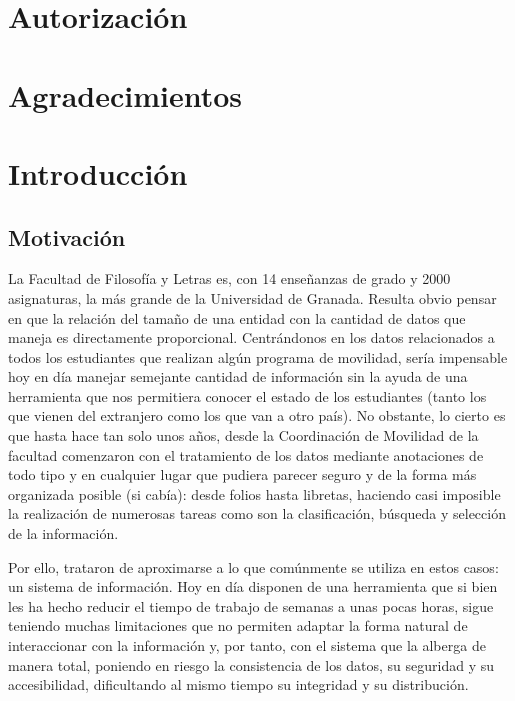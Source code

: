 \documentclass[12pt]{article}
\begin{document}


\section*{Autorización}

\section*{Agradecimientos}

\newpage

\tableofcontents

\newpage

\listoffigures
\listoftables


\section{Introducción}
\subsection{Motivación}

La Facultad de Filosofía y Letras es, con 14 enseñanzas de grado y 2000 asignaturas, la más grande de la Universidad de Granada. Resulta obvio pensar en que la relación del tamaño de una entidad con la cantidad de datos que maneja es directamente proporcional. Centrándonos en los datos relacionados a todos los estudiantes que realizan algún programa de movilidad, sería impensable hoy en día manejar semejante cantidad de información sin la ayuda de una herramienta que nos permitiera conocer el estado de los estudiantes (tanto los que vienen del extranjero como los que van a otro país). No obstante, lo cierto es que hasta hace tan solo unos años, desde la Coordinación de Movilidad de la facultad comenzaron con el tratamiento de los datos mediante anotaciones de todo tipo y en cualquier lugar que pudiera parecer seguro y de la forma más organizada posible (si cabía): desde folios hasta libretas, haciendo casi imposible la realización de numerosas tareas como son la clasificación, búsqueda y selección de la información.

Por ello, trataron de aproximarse a lo que comúnmente se utiliza en estos casos: un sistema de información. Hoy en día disponen de una herramienta que si bien les ha hecho reducir el tiempo de trabajo de semanas a unas pocas horas, sigue teniendo muchas limitaciones que no permiten adaptar la forma natural de interaccionar con la información y, por tanto, con el sistema que la alberga de manera total, poniendo en riesgo la consistencia de los datos, su seguridad y su accesibilidad, dificultando al mismo tiempo su integridad y su distribución.
\end{document}
